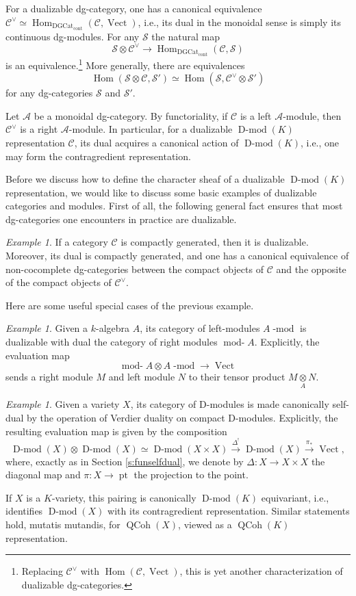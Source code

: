 \documentclass[10pt]{amsart}
\newcommand{\udHom}{\on{Hom}_{\DGCat}}
\newcommand{\on}{\operatorname}
\renewcommand{\mod}{\on{-mod}}
\newcommand{\Dmod}{\on{D-mod}}
\newcommand{\Vect}{\on{Vect}}
\newcommand{\rmod}{\on{mod-}}
\theoremstyle{remark}
\newtheorem{ex}[subsubsection]{Example}
\newcommand{\sA}{\mathscr{A}}
\newcommand{\sS}{\mathscr{S}}
\newcommand{\Hom}{\operatorname{Hom}}
\numberwithin{equation}{section}
\newcommand{\sC}{\mathscr{C}}
\newcommand{\msf}{\operatorname}
\renewcommand{\mod}{\operatorname{-mod}}
\newcommand{\QCoh}{\on{QCoh}}
\newcommand{\DGCat}{\msf{DGCat}_{\on{cont}}}
\begin{document}
For a dualizable dg-category, one has a canonical 
equivalence $\sC^\vee \simeq \udHom(\sC, 
\Vect)$, i.e., its dual in the monoidal sense is simply its continuous 
dg-modules. For any $\sS$ the natural map 
%
\[
    \sS \otimes \sC^\vee \rightarrow \udHom(\sC, \sS)
\]
%
is an equivalence.\footnote{Replacing $\sC^\vee$ with $\Hom(\sC, \Vect)$, this 
is yet another characterization of dualizable dg-categories.} More generally, 
there are equivalences
%
\[
\Hom( \sS \otimes \sC, \sS') \simeq \Hom( \sS, \sC^\vee \otimes \sS')
\]
%
for any dg-categories $\sS$ and $\sS'$. 


  Let $\sA$ be a monoidal dg-category. By functoriality, if $\sC$ is a left $\sA$-module, then $\sC^\vee$ is a right $\sA$-module. In particular, for a 
  dualizable $\Dmod(K)$ representation $\sC$, its dual acquires a canonical action of 
  $\Dmod(K)$, i.e., one may form the contragredient representation. 


Before we discuss how to define the character sheaf of a dualizable $\Dmod(K)$ representation, we would like to discuss some basic examples of dualizable categories and modules. First of 
all, the following general fact ensures that most dg-categories one encounters in practice are 
dualizable. 

\begin{ex}If a category $\sC$ is compactly generated, then it is dualizable. 
Moreover, its dual is compactly generated, and one has a canonical equivalence 
of non-cocomplete dg-categories between the compact objects of $\sC$ and the 
opposite of the compact objects of $\sC^\vee$. 
\end{ex}

Here are some useful special cases of the previous example. 
\begin{ex} Given a $k$-algebra $A$, its category of left-modules $A\mod$ is 
dualizable with dual the category of right modules $\on{mod-}A$. Explicitly, 
the 
evaluation map 
	\[
	   \rmod A \otimes A\mod \rightarrow \Vect
	\]
	sends a right module $M$ and left module $N$ to their tensor product $M 
	\underset A \otimes N$. 
\end{ex}



\begin{ex} \label{ex:dmodselfdual}Given a variety $X$, its category of D-modules is made canonically 
self-dual by the operation of Verdier duality on compact D-modules. Explicitly, the 
resulting evaluation map is given by the composition 
	\[
	 \Dmod(X) \otimes \Dmod(X) \simeq \Dmod(X \times X) \xrightarrow{\Delta^!} 
	 \Dmod(X) \xrightarrow{\pi_*} \Vect,
	\]
	where, exactly as in Section \ref{s:funselfdual}, we denote by $\Delta: X 
	\rightarrow X \times X$ the diagonal map and $\pi: X \rightarrow \on{pt}$ 
	the projection to the 
	point. 
	
	If $X$ is a $K$-variety, this pairing is canonically 
	$\Dmod(K)$ equivariant, i.e., identifies $\Dmod(X)$ with its contragredient 
	representation. Similar statements hold, mutatis mutandis, for $\QCoh(X)$, viewed as a $\QCoh(K)$ representation. 
\end{ex}
\end{document}
